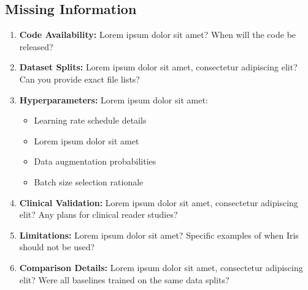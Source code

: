 \subsection{Missing Information}
\begin{enumerate}
    \item \textbf{Code Availability:} Lorem ipsum dolor sit amet? When will the code be released?
    
    \item \textbf{Dataset Splits:} Lorem ipsum dolor sit amet, consectetur adipiscing elit? Can you provide exact file lists?
    
    \item \textbf{Hyperparameters:} Lorem ipsum dolor sit amet:
    \begin{itemize}
        \item Learning rate schedule details
        \item Lorem ipsum dolor sit amet
        \item Data augmentation probabilities
        \item Batch size selection rationale
    \end{itemize}
    
    \item \textbf{Clinical Validation:} Lorem ipsum dolor sit amet, consectetur adipiscing elit? Any plans for clinical reader studies?
    
    \item \textbf{Limitations:} Lorem ipsum dolor sit amet? Specific examples of when Iris should not be used?
    
    \item \textbf{Comparison Details:} Lorem ipsum dolor sit amet, consectetur adipiscing elit? Were all baselines trained on the same data splits?
\end{enumerate}